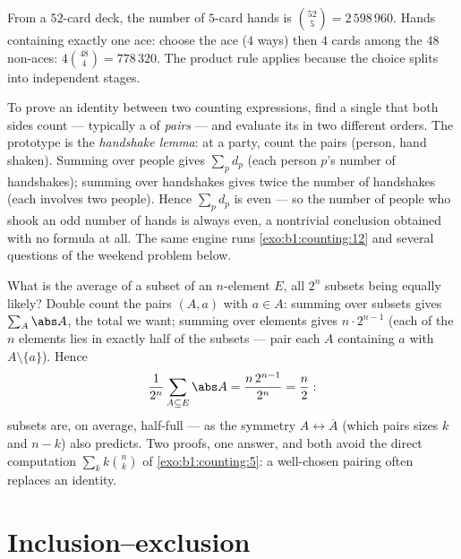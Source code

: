 \begin{example}\label{ex:b1:counting:poker}
From a $52$-card deck, the number of $5$-card hands is
$\binom{52}{5} = 2\,598\,960$. Hands containing exactly one ace:
choose the ace ($4$ ways) then $4$ cards among the $48$ non-aces:
$4 \binom{48}{4} = 778\,320$. The product rule applies because the
choice splits into independent stages.
\end{example}

\begin{method}\label{met:b1:counting:doublecount}
To prove an identity between two counting expressions, find a single
 that both sides count --- typically a  of \emph{pairs}
--- and evaluate its  in two different orders. The
prototype is the \emph{handshake lemma}: at a party, count the pairs
(person, hand shaken). Summing over people gives $\sum_p d_p$ (each
person $p$'s number of handshakes); summing over handshakes gives
twice the number of handshakes (each involves two people). Hence
$\sum_p d_p$ is even --- so the number of people who shook an odd
number of hands is always even, a nontrivial conclusion obtained
with no formula at all. The same engine runs
\cref{exo:b1:counting:12} and several questions of the weekend
problem below.
\end{method}

\begin{example}\label{ex:b1:counting:averagesubset}
What is the average  of a subset of an $n$-element 
$E$, all $2^n$ subsets being equally likely? Double count the
pairs $(A, a)$ with $a \in A$: summing over subsets gives
$\sum_A \abs A$, the total we want; summing over elements gives
$n \cdot 2^{n-1}$ (each of the $n$ elements lies in exactly half
of the subsets --- pair each $A$ containing $a$ with $A
\setminus \{a\}$). Hence
\[
\frac{1}{2^n}\sum_{A \subseteq E} \abs A
= \frac{n\,2^{n-1}}{2^n} = \frac n2 :
\]
subsets are, on average, half-full --- as the symmetry $A
\leftrightarrow \overline A$ (which pairs sizes $k$ and $n - k$)
also predicts. Two proofs, one answer, and both avoid the direct
computation $\sum_k k\binom nk$ of \cref{exo:b1:counting:5}: a
well-chosen pairing often replaces an identity.
\end{example}

\section{Inclusion--exclusion}


